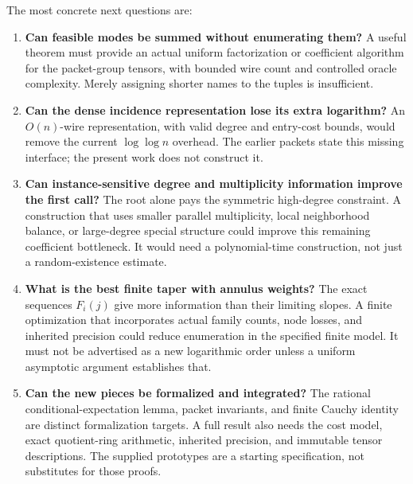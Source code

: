 \documentclass[11pt,letterpaper]{article}
\theoremstyle{remark}\newtheorem{remark}[theorem]{Remark}
\begin{document}
The most concrete next questions are:
\begin{enumerate}[leftmargin=1.6em]
\item \textbf{Can feasible modes be summed without enumerating them?}
A useful theorem must provide an actual uniform factorization or
coefficient algorithm for the packet-group tensors, with bounded wire
count and controlled oracle complexity. Merely assigning shorter names
to the tuples is insufficient.
\item \textbf{Can the dense incidence representation lose its extra logarithm?}
An $O(n)$-wire representation, with valid degree and entry-cost bounds,
would remove the current $\log\log n$ overhead. The earlier packets state
this missing interface; the present work does not construct it.
\item \textbf{Can instance-sensitive degree and multiplicity information
improve the first call?}
The root alone pays the symmetric high-degree constraint. A construction
that uses smaller parallel multiplicity, local neighborhood balance, or
large-degree special structure could improve this remaining coefficient
bottleneck. It would need a polynomial-time construction, not just a
random-existence estimate.
\item \textbf{What is the best finite taper with annulus weights?}
The exact sequences $F_i(j)$ give more information than their limiting
slopes. A finite optimization that incorporates actual family counts,
node losses, and inherited precision could reduce enumeration in the
specified finite model. It must not be advertised as a new logarithmic
order unless a uniform asymptotic argument establishes that.
\item \textbf{Can the new pieces be formalized and integrated?}
The rational conditional-expectation lemma, packet invariants, and finite
Cauchy identity are distinct formalization targets. A full result also
needs the cost model, exact quotient-ring arithmetic, inherited
precision, and immutable tensor descriptions. The supplied prototypes
are a starting specification, not substitutes for those proofs.
\end{enumerate}

\appendix
\end{document}
